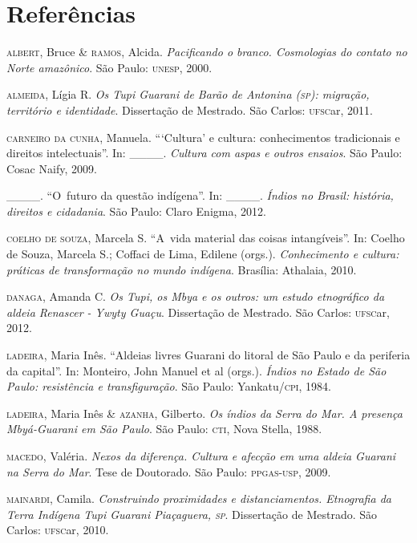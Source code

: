 \section{Referências}

\begin{Parskip}
\textsc{albert}, Bruce \& \textsc{ramos}, Alcida. \emph{Pacificando o branco. Cosmologias do
contato no Norte amazônico}. São Paulo: \textsc{unesp}, 2000.

\textsc{almeida}, Lígia R. \emph{Os Tupi Guarani de Barão de Antonina (\textsc{sp}): migração,
território e identidade}. Dissertação de Mestrado. São Carlos: \textsc{ufsc}ar,
2011.

\textsc{carneiro da cunha}, Manuela. ``‘Cultura’ e cultura: conhecimentos
tradicionais e direitos intelectuais''. In: \_\_\_\_. \emph{Cultura com aspas e outros
ensaios}. São Paulo: Cosac Naify, 2009. 

\_\_\_\_. ``O~futuro da questão indígena''. In: \_\_\_\_. \emph{Índios no Brasil: história,
direitos e cidadania}. São Paulo: Claro Enigma, 2012.

\textsc{coelho de souza}, Marcela S. ``A~vida material das coisas intangíveis''.
In: Coelho de Souza, Marcela S.; Coffaci de Lima, Edilene (orgs.).
\emph{Conhecimento e cultura: práticas de transformação no mundo indígena}.
Brasília: Athalaia, 2010.

\textsc{danaga}, Amanda C. \emph{Os Tupi, os Mbya e os outros: um estudo etnográfico da
aldeia Renascer - Ywyty Guaçu}. Dissertação de Mestrado. São Carlos:
\textsc{ufsc}ar, 2012. 

\textsc{ladeira}, Maria Inês. ``Aldeias livres Guarani do litoral de São Paulo e
da periferia da capital''. In: Monteiro, John Manuel et al (orgs.).
\emph{Índios no Estado de São Paulo: resistência e transfiguração}. São Paulo:
Yankatu/\textsc{cpi}, 1984.

\textsc{ladeira}, Maria Inês \& \textsc{azanha}, Gilberto. \emph{Os índios da Serra do Mar. A
presença Mbyá-Guarani em São Paulo}. São Paulo: \textsc{cti}, Nova Stella, 1988.

\textsc{macedo}, Valéria. \emph{Nexos da diferença. Cultura e afecção em uma aldeia
Guarani na Serra do Mar}. Tese de Doutorado. São Paulo: \textsc{ppgas}-\textsc{usp},
2009.

\textsc{mainardi}, Camila. \emph{Construindo proximidades e distanciamentos. Etnografia
da Terra Indígena Tupi Guarani Piaçaguera, \textsc{sp}}. Dissertação de Mestrado.
São Carlos: \textsc{ufsc}ar, 2010.


\end{Parskip}
